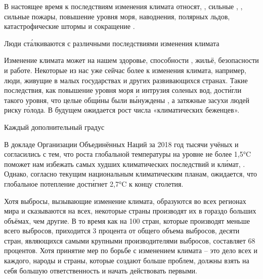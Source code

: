 В настоящее время к последствиям изменения климата относят, , сильные , , сильные пожары, повышение уровня моря, наводнения,  полярных льдов, катастрофические штормы и сокращение .

\begin{fancyquotes}
    Люди ст\'{а}лкиваются с различными последствиями изменения климата
\end{fancyquotes}

Изменение климата может  на нашем здоровье, способности  , жильё, безопасности и работе.
Некоторые из нас уже сейчас более  к  изменения климата, например, люди, живущие в малых  государствах и других развивающихся странах. Такие последствия, как повышение уровня моря и интрузия соленых вод, дост\'{и}гли такого уровня, что целые общ\'{и}ны были в\'{ы}нуждены , а затяжные засухи  людей риску г\'{о}лода. В будущем ожидается рост числа «климатических беженцев».

\begin{fancyquotes}
    Каждый дополнительный градус  
\end{fancyquotes}

В докладе Организации Объединённых Наций за 2018 год тысячи учёных и  согласились с тем, что  роста глобальной температуры на уровне не более 1,5°C поможет нам избежать самых худших климатических последствий и  кл\'{и}мат, . Однако, согласно текущим национальным климатическим планам, ожидается, что глобальное потепление дост\'{и}гнет 2,7°C к концу столетия.

Хотя выбросы, вызывающие изменение климата, образуются во всех регионах мира и сказываются на всех, некоторые страны производят их в гораздо больших объёмах, чем другие. В то время как на 100 стран, которые производят меньше всего выбросов, приходится 3 процента от общего объема выбросов,  десяти стран, являющихся самыми крупными производителями выбросов, составляет 68 процентов. Хотя принятие мер по борьбе с изменением климата -- это дело всех и каждого, народы и страны, которые создают больше проблем, должны взять на себя большую ответственность и начать действовать первыми.

